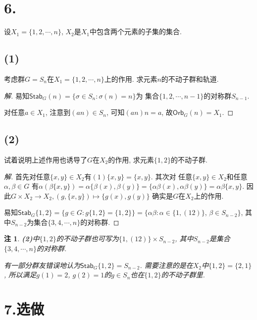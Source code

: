 \documentclass[12pt, a4paper, fontset=windows]{ctexart}
\newcommand{\Orb}{\mathsf{Orb}}
\newcommand{\Stab}{\mathsf{Stab}}
\newcommand{\xuan}{{\normalsize 选做}}
\newtheorem*{remark}{注}
\newenvironment{solution}{\begin{proof}[解]}{\end{proof}}
\begin{document}
\section*{6.}

设$X_1=\{1,2,\cdots,n\}$, $X_2$是$X_1$中包含两个元素的子集的集合. 

\subsection*{(1)}

考虑群$G=S_n$在$X_1=\{1,2,\cdots,n\}$上的作用. 求元素$n$的不动子群和轨道. 

\begin{solution}
易知$\Stab_G(n)=\{\sigma\in S_n:\sigma(n)=n\}$为
集合$\{1,2,\cdots,n-1\}$的对称群$S_{n-1}$. 

对任意$a\in X_1$, 注意到$(an)\in S_n$, 
可知$(an)n=a$, 故$\Orb_G(n)=X_1$. 
\end{solution}

\subsection*{(2)}

试着说明上述作用也诱导了$G$在$X_2$的作用, 求元素$\{1,2\}$的不动子群. 

\begin{solution}
首先对任意$\{x,y\}\in X_2$有$(1)\{x,y\}=\{x,y\}$. 其次对
任意$\{x,y\}\in X_2$和任意$\alpha,\beta\in G$
有$\alpha(\beta\{x,y\})=\alpha\{\beta(x),\beta(y)\}
=\{\alpha\beta(x),\alpha\beta(y)\}=\alpha\beta\{x,y\}$. 
因此$G\times X_2\to X_2,(g,\{x,y\})\mapsto\{g(x),g(y)\}$
确实是$G$在$X_2$上的作用. 

易知$\Stab_G\{1,2\}=\{g\in G:g\{1,2\}=\{1,2\}\}
=\{\alpha\beta:\alpha\in\{1,(12)\}$, $\beta\in S_{n-2}\}$, 
其中$S_{n-2}$为集合$\{3,4,\cdots,n\}$的对称群. 
\end{solution}

\begin{remark}
{\bf (2)}中$\{1,2\}$的不动子群也可写为$\{1,(12)\}\times S_{n-2}$, 
其中$S_{n-2}$是集合$\{3,4,\cdots,n\}$的对称群. 

有一部分群友错误地认为$\Stab_G{\{1,2\}}=S_{n-2}$. 
需要注意的是在$X_2$中$\{1,2\}=\{2,1\}$, 所以满足$g(1)=2$, 
$g(2)=1$的$g\in S_n$也在$\{1,2\}$的不动子群里. 
\end{remark}

\section*{7.\xuan}
\end{document}
